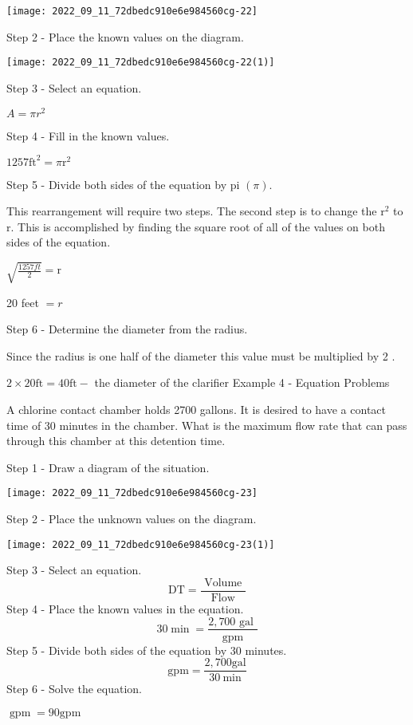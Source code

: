 \texttt{[image: 2022\_09\_11\_72dbedc910e6e984560cg-22]}

Step 2 - Place the known values on the diagram.

\texttt{[image: 2022\_09\_11\_72dbedc910e6e984560cg-22(1)]}

Step 3 - Select an equation.

$A=\pi r^{2}$

Step 4 - Fill in the known values.

$1257 \mathrm{ft}^{2}=\pi \mathrm{r}^{2}$

Step 5 - Divide both sides of the equation by pi $(\pi)$.

This rearrangement will require two steps. The second step is to change the $\mathrm{r}^{2}$ to $\mathrm{r}$. This is accomplished by finding the square root of all of the values on both sides of the equation.

$\sqrt{\frac{1257 f t}{2}}=\mathrm{r}$

20 feet $=r$

Step 6 - Determine the diameter from the radius.

Since the radius is one half of the diameter this value must be multiplied by 2 .

$2 \times 20 \mathrm{ft}=40 \mathrm{ft}-$ the diameter of the clarifier Example 4 - Equation Problems

A chlorine contact chamber holds 2700 gallons. It is desired to have a contact time of 30 minutes in the chamber. What is the maximum flow rate that can pass through this chamber at this detention time.

Step 1 - Draw a diagram of the situation.

\texttt{[image: 2022\_09\_11\_72dbedc910e6e984560cg-23]}

Step 2 - Place the unknown values on the diagram.

\texttt{[image: 2022\_09\_11\_72dbedc910e6e984560cg-23(1)]}

Step 3 - Select an equation.
$$
\mathrm{DT}=\frac{\text { Volume }}{\text { Flow }}
$$
Step 4 - Place the known values in the equation.
$$
30 \min =\frac{2,700 \text { gal }}{\text { gpm }}
$$
Step 5 - Divide both sides of the equation by 30 minutes.
$$
\mathrm{gpm}=\frac{2,700 \mathrm{gal}}{30 \mathrm{~min}}
$$
Step 6 - Solve the equation.

$\operatorname{gpm}=90 \mathrm{gpm}$

